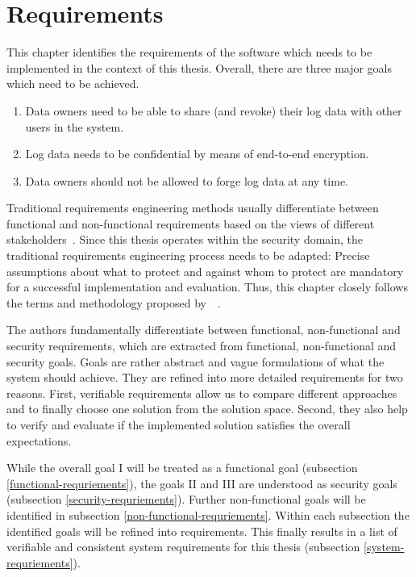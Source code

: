 \documentclass[../main.tex]{subfiles}
\begin{document}
\chapter{Requirements}
\label{chap:requirements}

This chapter identifies the requirements of the software which needs to be implemented in the context of this thesis.
Overall, there are three major goals which need to be achieved. 

\begin{enumerate}[label=\Roman*.]
    \item Data owners need to be able to share (and revoke) their log data with other users in the system.
	\item Log data needs to be confidential by means of end-to-end encryption.
    \item Data owners should not be allowed to forge log data at any time.
\end{enumerate}


Traditional requirements engineering methods usually differentiate between functional and non-functional requirements based on the views of different stakeholders~.
Since this thesis operates within the security domain, the traditional requirements engineering process needs to be adapted: 
Precise assumptions about what to protect and against whom to protect are mandatory for a successful implementation and evaluation.
Thus, this chapter closely follows the terms and methodology proposed by~\citeauthor{Fabian2010}~\cite{Fabian2010}.

The authors fundamentally differentiate between functional, non-functional and security requirements, which are extracted from functional, non-functional and security goals.
Goals are rather abstract and vague formulations of what the system should achieve. 
They are refined into more detailed requirements for two reasons.
First, verifiable requirements allow us to compare different approaches and to finally choose one solution from the solution space. 
Second, they also help to verify and evaluate if the implemented solution satisfies the overall expectations.~\cite{Fabian2010}

While the overall goal I will be treated as a functional goal (subsection \ref{functional-requriements}), the goals II and III are understood as security goals (subsection \ref{security-requriements}).
Further non-functional goals will be identified in subsection \ref{non-functional-requriements}.
Within each subsection the identified goals will be refined into requirements.
This finally results in a list of verifiable and consistent system requirements for this thesis (subsection \ref{system-requriements}).
\end{document}
